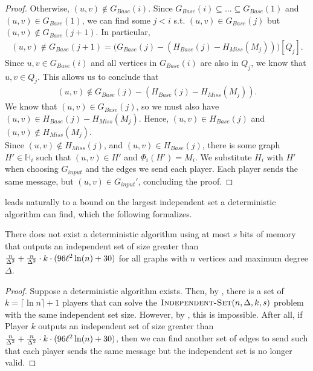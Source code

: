\documentclass[11pt]{article}
\begin{document}
\begin{proof}
Otherwise, $(u, v)\not\in G_{Base}(i)$. Since $G_{Base}(i)\subseteq\dots\subseteq G_{Base}(1)$ and $(u, v)\in G_{Base}(1)$, we can find some $j<i$ s.t. $(u, v)\in G_{Base}(j)$ but $(u, v)\not\in G_{Base}(j+1)$. In particular,
\begin{align*}
(u,v)\not\in G_{Base}(j+1)=\big(G_{Base}(j)-(H_{Base}(j)-H_{Miss}(M_j))\big)[Q_j].
\end{align*}
Since $u, v\in G_{Base}(i)$ and all vertices in $G_{Base}(i)$ are also in $Q_j$, we know that $u,v\in Q_j$. This allows us to conclude that 
\begin{align*}
    (u, v)\not\in G_{Base}(j)-(H_{Base}(j)-H_{Miss}(M_j)).
\end{align*}
We know that $(u, v)\in G_{Base}(j)$, so we must also have $(u, v)\in H_{Base}(j)-H_{Miss}(M_j)$. Hence, $(u, v)\in H_{Base}(j)$ and $(u, v)\not\in H_{Miss}(M_j)$. \\

Since $(u, v)\not\in H_{Miss}(j)$, and $(u, v)\in H_{Base}(j)$, there is some graph $H'\in \mathbb{H}_i$ such that $(u, v)\in H'$ and $\Phi_i(H')=M_i$. We substitute $H_i$ with $H'$ when choosing $G_{input}$ and the edges we send each player. Each player sends the same message, but $(u, v)\in G_{input}'$, concluding the proof. 
\end{proof}

 leads naturally to a bound on the largest independent set a deterministic algorithm can find, which the following formalizes. 

\begin{lemma}\label{deterministic-lower-bound}
There does not exist a deterministic algorithm using at most $s$ bits of memory that outputs an independent set of size greater than $\frac{n}{\Delta^2}+\frac{n}{\Delta^2}\cdot k\cdot (96{\ell}^2\ln(n)+30)$ for all graphs with $n$ vertices and maximum degree $\Delta$.
\end{lemma}
\begin{proof}
    Suppose a deterministic algorithm exists. Then, by , there is a set of $k=\lceil \ln n\rceil +1$ players that can solve the $\textnormal{\textsc{Independent-Set}}(n, \Delta, k, s)$ problem with the same independent set size. However, by , this is impossible. After all, if Player $k$ outputs an independent set of size greater than $\frac{n}{\Delta^2}+\frac{n}{\Delta^2}\cdot k\cdot (96{\ell}^2\ln(n)+30)$, then we can find another set of edges to send such that each player sends the same message but the independent set is no longer valid. 
\end{proof}
\end{document}
